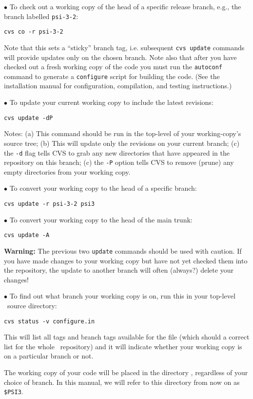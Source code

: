 \noindent
$\bullet$ To check out a working copy of the head of a specific release branch,
e.g., the branch labelled {\tt psi-3-2}:

{\tt cvs co -r psi-3-2}

\noindent Note that this sets a ``sticky'' branch tag, i.e. subsequent
{\tt cvs update} commands will provide updates only on the chosen branch.
Note also that after you have checked out a fresh working copy of the code
you must run the {\tt autoconf} command to generate a {\tt configure} script
for building the code.  (See the installation manual for configuration,
compilation, and testing instructions.)

\noindent
$\bullet$ To update your current working copy to include the latest revisions:

{\tt cvs update -dP}

\noindent
Notes: (a) This command should be run in the top-level of your working-copy's
source tree; (b) This will update only the revisions on your current branch;
(c) the {\tt -d} flag tells CVS to grab any new directories that have
appeared in the repository on this branch; (c) the {\tt -P} option tells
CVS to remove (prune) any empty directories from your working copy.

\noindent
$\bullet$ To convert your working copy to the head of a specific branch:

{\tt cvs update -r psi-3-2 psi3}

\noindent
$\bullet$ To convert your working copy to the head of the main trunk:

{\tt cvs update -A}

\noindent
{\bf Warning:} The previous two {\tt update} commands should be used {\sc
with caution}.  If you have made changes to your working copy but have
not yet checked them into the repository, the update to another branch
will often (always?) delete your changes!

\noindent
$\bullet$ To find out what branch your working copy is on, run this in your
top-level \PSIthree\ source directory:

{\tt cvs status -v configure.in}

\noindent
This will list all tags and branch tags available for the file (which
should a correct list for the whole \PSIthree\ repository) and it will
indicate whether your working copy is on a particular branch or not.

\noindent
The working copy of your code will be placed in the directory ,
regardless of your choice of branch.  In this manual, we will refer to
this directory from now on as {\tt \$PSI3}.  


